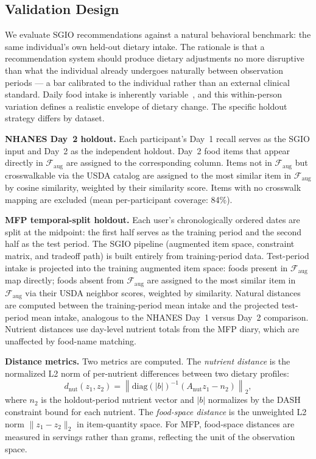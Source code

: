 \documentclass[journal]{IEEEtran}
\newcommand{\Faug}{\mathcal{F}_{\mathrm{aug}}}
\begin{document}
\subsection{Validation Design}
\label{subsec:validation}

We evaluate SGIO recommendations against a natural behavioral
benchmark: the same individual's own held-out dietary intake. The
rationale is that a recommendation system should produce dietary
adjustments no more disruptive than what the individual already
undergoes naturally between observation periods --- a bar calibrated to
the individual rather than an external clinical standard. Daily food
intake is inherently variable~\cite{beaton1979sources}, and this
within-person variation defines a realistic envelope of dietary change.
The specific holdout strategy differs by dataset.

\textbf{NHANES Day~2 holdout.} Each participant's Day~1 recall serves as
the SGIO input and Day~2 as the independent holdout. Day~2 food items
that appear directly in $\Faug$ are assigned to the corresponding column.
Items not in $\Faug$ but crosswalkable via the USDA catalog are assigned
to the most similar item in $\Faug$ by cosine similarity, weighted by
their similarity score. Items with no crosswalk mapping are excluded
(mean per-participant coverage: 84\%).

\textbf{MFP temporal-split holdout.} Each user's chronologically ordered
dates are split at the midpoint: the first half serves as the training
period and the second half as the test period. The SGIO pipeline
(augmented item space, constraint matrix, and tradeoff path) is built
entirely from training-period data. Test-period intake is projected into
the training augmented item space: foods present in $\Faug$ map directly;
foods absent from $\Faug$ are assigned to the most similar item in
$\Faug$ via their USDA neighbor scores, weighted by similarity. Natural
distances are computed between the training-period mean intake and the
projected test-period mean intake, analogous to the NHANES Day~1 versus
Day~2 comparison. Nutrient distances use day-level nutrient totals from
the MFP diary, which are unaffected by food-name matching.

\textbf{Distance metrics.} Two metrics are computed. The
\emph{nutrient distance} is the normalized L2 norm of per-nutrient
differences between two dietary profiles:
\begin{equation}
d_{\mathrm{nut}}(z_1, z_2) =
\left\|\mathrm{diag}(|b|)^{-1}
(A_{\mathrm{nut}}z_1 - n_2)\right\|_2,
\label{eq:nut_dist}
\end{equation}
where $n_2$ is the holdout-period nutrient vector and $|b|$ normalizes
by the DASH constraint bound for each nutrient. The \emph{food-space
distance} is the unweighted L2 norm $\|z_1 - z_2\|_2$ in item-quantity
space. For MFP, food-space distances are measured in servings rather than
grams, reflecting the unit of the observation space.
\end{document}
